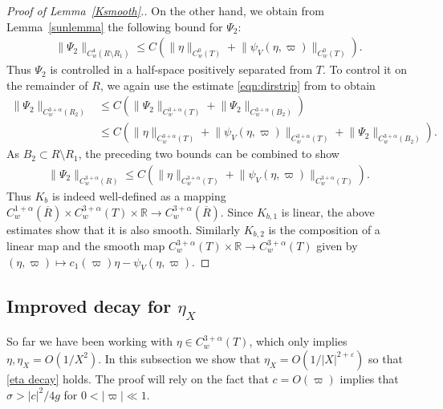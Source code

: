 \documentclass[11pt,reqno]{amsart}
\newcommand{\R}{\mathbb{R}}
\newcommand{\n}[2][]{#1\lVert #2 #1\rVert}
\newcommand{\abs}[2][]{#1\lvert #2 #1\rvert}
\theoremstyle{plain}
\theoremstyle{remark}
\numberwithin{equation}{section}
\begin{document}
\begin{proof}[Proof of Lemma~\ref{Ksmooth}.]
  On the other hand, we obtain from Lemma~\ref{sunlemma} the following bound for $\Psi_2$: 
  \begin{align*} 
    \n{\Psi_2}_{C^4_w(R \setminus R_1)} \le C \left(\n{\eta}_{C^0_w(T)} + \n{\psi_V(\eta,\varpi)}_{C^0_w(T)}\right).
  \end{align*}
  Thus $\Psi_2$ is controlled in a half-space positively separated from $T$. To control it on the remainder of $R$, we again use the estimate \eqref{eqn:dirstrip} from \cite[Lemma~5.2]{craig1988symmetry} to obtain
  \begin{align*}
    \n {\Psi_2}_{C^{3+\alpha}_w(R_2)}  &\le 
    C\left( \n{\Psi_2}_{C^{3+\alpha}_w(T)} + \n{\Psi_2}_{C^{3+\alpha}_w(B_2)} \right)\\  
    &\le
    C\left( \n{\eta}_{C^{3+\alpha}_w(T)} + \n{\psi_V(\eta,\varpi)}_{C^{3+\alpha}_w(T)} + \n{\Psi_2}_{C^{3+\alpha}_w(B_2)} \right).  
  \end{align*}
  As $B_2 \subset R\setminus R_1$, the preceding two bounds can be combined to show
  \begin{align*}
    \n{\Psi_2}_{C^{3+\alpha}_w(R)} \le C\left( \n{\eta}_{C^{3+\alpha}_w(T)} + \n{\psi_V(\eta,\varpi)}_{C^{3+\alpha}_w(T)} \right).
  \end{align*}
  Thus $K_b$ is indeed well-defined as a
  mapping $C^{1+\alpha}_w(\overline R) \times C^{3+\alpha}_w(T) \times \R \to
  C^{3+\alpha}_w(\overline R)$. Since $K_{b,1}$ is linear, the above
  estimates show that it is also smooth. Similarly $K_{b,2}$ is the composition
  of a linear map and the smooth map $C_w^{3+\alpha}(T) \times \R \to C^{3+\alpha}_w(T)$ given by $(\eta,\varpi) \mapsto c_1(\varpi)\eta - \psi_V(\eta,\varpi)$.
\end{proof}

\subsection{Improved decay for \texorpdfstring{$\eta_X$}{eta\_X}}

So far we have been working with $\eta \in C^{3+\alpha}_w(T)$, which only implies $\eta,\eta_X = O(1/X^2)$. In this subsection we show that $\eta_X = O(1/\abs X^{2+\varepsilon})$ so that \eqref{eta decay} holds. The proof will rely on the fact that $c = O(\varpi)$ implies that $\sigma > |c|^2/4g$ for $0 < \abs\varpi \ll 1$. 
\end{document}
